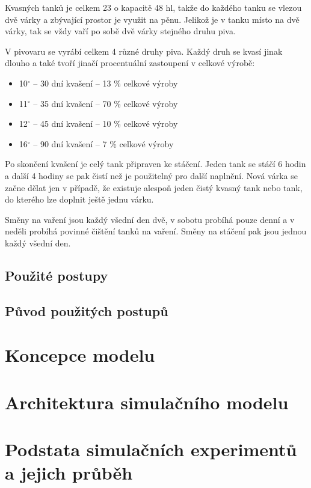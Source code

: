 \documentclass[11pt,a4paper]{article}
\begin{document}
Kvasných tanků je celkem 23 o kapacitě 48 hl, takže do každého tanku se vlezou dvě várky a zbývající prostor je využit na pěnu. Jelikož je v tanku místo na dvě várky, tak se vždy vaří po sobě dvě várky stejného druhu piva. 

V pivovaru se vyrábí celkem 4 různé druhy piva. Každý druh se kvasí jinak dlouho a také tvoří jinačí procentuální zastoupení v celkové výrobě:
\begin{itemize}
  \item 10$^\circ$ -- 30 dní kvašení -- 13 \% celkové výroby
  \item 11$^\circ$ -- 35 dní kvašení -- 70 \% celkové výroby
  \item 12$^\circ$ -- 45 dní kvašení -- 10 \% celkové výroby
  \item 16$^\circ$ -- 90 dní kvašení -- 7 \% celkové výroby
\end{itemize}

Po skončení kvašení je celý tank připraven ke stáčení. Jeden tank se stáčí 6 hodin a další 4 hodiny se pak čistí než je použitelný pro další naplnění. Nová várka se začne dělat jen v případě, že existuje alespoň jeden čistý kvasný tank nebo tank, do kterého lze doplnit ještě jednu várku.

Směny na vaření jsou každý všední den dvě, v sobotu probíhá pouze denní a v neděli probíhá povinné čištění tanků na vaření. Směny na stáčení pak jsou jednou každý všední den.



\subsection{Použité postupy}


\subsection{Původ použitých postupů}


\section{Koncepce modelu}


\section{Architektura simulačního modelu}


\section{Podstata simulačních experimentů a jejich průběh}
\end{document}
